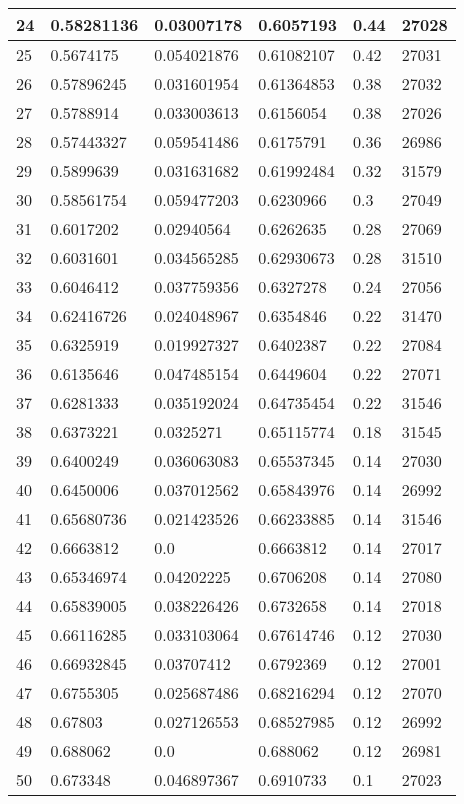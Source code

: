 \begin{longtable}{|l|l|l|l|l|l|}
24 & 0.58281136 & 0.03007178 & 0.6057193 & 0.44 & 27028 \\ \hline 
25 & 0.5674175 & 0.054021876 & 0.61082107 & 0.42 & 27031 \\ \hline 
26 & 0.57896245 & 0.031601954 & 0.61364853 & 0.38 & 27032 \\ \hline 
27 & 0.5788914 & 0.033003613 & 0.6156054 & 0.38 & 27026 \\ \hline 
28 & 0.57443327 & 0.059541486 & 0.6175791 & 0.36 & 26986 \\ \hline 
29 & 0.5899639 & 0.031631682 & 0.61992484 & 0.32 & 31579 \\ \hline 
30 & 0.58561754 & 0.059477203 & 0.6230966 & 0.3 & 27049 \\ \hline 
31 & 0.6017202 & 0.02940564 & 0.6262635 & 0.28 & 27069 \\ \hline 
32 & 0.6031601 & 0.034565285 & 0.62930673 & 0.28 & 31510 \\ \hline 
33 & 0.6046412 & 0.037759356 & 0.6327278 & 0.24 & 27056 \\ \hline 
34 & 0.62416726 & 0.024048967 & 0.6354846 & 0.22 & 31470 \\ \hline 
35 & 0.6325919 & 0.019927327 & 0.6402387 & 0.22 & 27084 \\ \hline 
36 & 0.6135646 & 0.047485154 & 0.6449604 & 0.22 & 27071 \\ \hline 
37 & 0.6281333 & 0.035192024 & 0.64735454 & 0.22 & 31546 \\ \hline 
38 & 0.6373221 & 0.0325271 & 0.65115774 & 0.18 & 31545 \\ \hline 
39 & 0.6400249 & 0.036063083 & 0.65537345 & 0.14 & 27030 \\ \hline 
40 & 0.6450006 & 0.037012562 & 0.65843976 & 0.14 & 26992 \\ \hline 
41 & 0.65680736 & 0.021423526 & 0.66233885 & 0.14 & 31546 \\ \hline 
42 & 0.6663812 & 0.0 & 0.6663812 & 0.14 & 27017 \\ \hline 
43 & 0.65346974 & 0.04202225 & 0.6706208 & 0.14 & 27080 \\ \hline 
44 & 0.65839005 & 0.038226426 & 0.6732658 & 0.14 & 27018 \\ \hline 
45 & 0.66116285 & 0.033103064 & 0.67614746 & 0.12 & 27030 \\ \hline 
46 & 0.66932845 & 0.03707412 & 0.6792369 & 0.12 & 27001 \\ \hline 
47 & 0.6755305 & 0.025687486 & 0.68216294 & 0.12 & 27070 \\ \hline 
48 & 0.67803 & 0.027126553 & 0.68527985 & 0.12 & 26992 \\ \hline 
49 & 0.688062 & 0.0 & 0.688062 & 0.12 & 26981 \\ \hline 
50 & 0.673348 & 0.046897367 & 0.6910733 & 0.1 & 27023 \\ \hline 
\end{longtable}